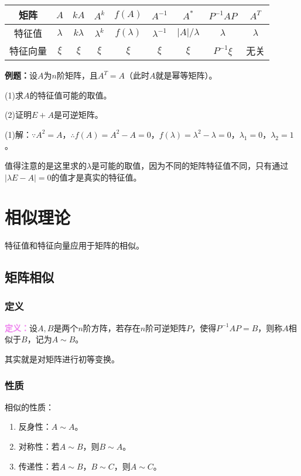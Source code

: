 \documentclass[UTF8, 12pt]{ctexart}
\begin{document}
\begin{tabular}{|c|c|c|c|c|c|c|c|c|}
    \hline
    矩阵 & $A$ & $kA$ & $A^k$ & $f(A)$ & $A^{-1}$ & $A^*$ & $P^{-1}AP$ & $A^T$ \\ \hline
    特征值 & $\lambda$ & $k\lambda$ & $\lambda^k$ & $f(\lambda)$ & $\lambda^{-1}$ & $\vert A\vert/\lambda$ & $\lambda$ & $\lambda$ \\ \hline
    特征向量 & $\xi$ & $\xi$ & $\xi$ & $\xi$ & $\xi$ & $\xi$ & $P^{-1}\xi$ & 无关 \\
    \hline
\end{tabular} \medskip

\textbf{例题：}设$A$为$n$阶矩阵，且$A^T=A$（此时$A$就是幂等矩阵）。

(1)求$A$的特征值可能的取值。

(2)证明$E+A$是可逆矩阵。

(1)解：$\because A^2=A$，$\therefore f(A)=A^2-A=0$，$f(\lambda)=\lambda^2-\lambda=0$，$\lambda_1=0$，$\lambda_2=1$。

值得注意的是这里求的$\lambda$是可能的取值，因为不同的矩阵特征值不同，只有通过$\vert\lambda E-A\vert=0$的值才是真实的特征值。

\section{相似理论}

特征值和特征向量应用于矩阵的相似。

\subsection{矩阵相似}

\subsubsection{定义}

\textcolor{violet}{\textbf{定义：}}设$A,B$是两个$n$阶方阵，若存在$n$阶可逆矩阵$P$，使得$P^{-1}AP=B$，则称$A$相似于$B$，记为$A\sim B$。

其实就是对矩阵进行初等变换。

\subsubsection{性质}

相似的性质：

\begin{enumerate}
    \item 反身性：$A\sim A$。
    \item 对称性：若$A\sim B$，则$B\sim A$。
    \item 传递性：若$A\sim B$，$B\sim C$，则$A\sim C$。
\end{enumerate}
\end{document}

